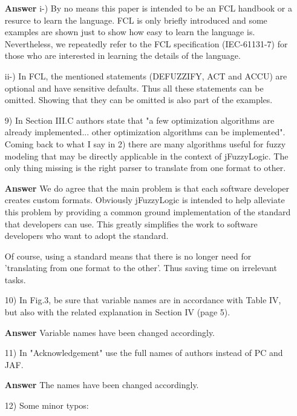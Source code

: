 \documentclass[10pt,a4paper]{article}
\begin{document}
\begin{itemize}
   	\item[\textbf{Answer}] 
   	i-) By no means this paper is intended to be an FCL handbook or a resurce to learn the language. FCL is only briefly introduced and some examples are shown just to show how easy to learn the language is. Nevertheless, we repeatedly refer to the FCL specification (IEC-61131-7) for those who are interested in learning the details of the language.

   	ii-) In FCL, the mentioned statements (DEFUZZIFY, ACT and ACCU) are optional and have sensitive defaults. Thus all these statements can be omitted. Showing that they can be omitted is also part of the examples.

   \item[9)] In Section III.C authors state that "a few optimization algorithms are
   already implemented... other optimization algorithms can be implemented". Coming
   back to what I say in 2) there are many algorithms useful for fuzzy modeling
   that may be directly applicable in the context of jFuzzyLogic. The only thing
   missing is the right parser to translate from one format to other.

	\item[\textbf{Answer}] We do agree that the main problem is that each software developer creates custom formats. 
	Obviously jFuzzyLogic is intended to help alleviate this problem by providing a common ground implementation of the standard that developers can use. 
	This greatly simplifies the work to software developers who want to adopt the standard.
	
	Of course, using a standard means that there is no longer need for 'translating from one format to the other'. 
	Thus saving time on irrelevant tasks.

   \item[10)] In Fig.3, be sure that variable names are in accordance with Table IV, but
   also with the related explanation in Section IV (page 5).

   	\item[\textbf{Answer}] Variable names have been changed accordingly.

   \item[11)] In "Acknowledgement" use the full names of authors instead of PC and JAF.
   
   	\item[\textbf{Answer}] The names have been changed accordingly.
   	


   \item[12)] Some minor typos:


\end{itemize}
\end{document}
